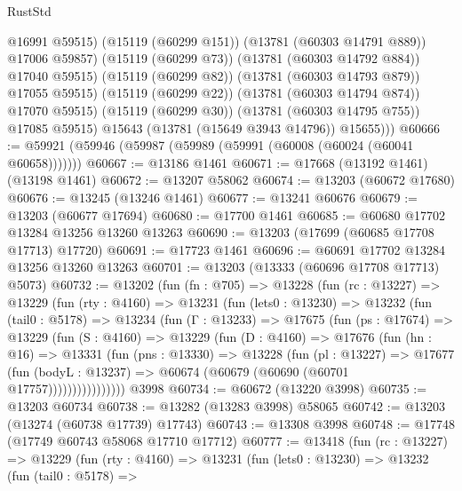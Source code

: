 \begin{lexlean}{RustStd}
\begin{coremodule}
                      @16991
                      @59515)
                    (@15119 (@60299 @151))
                    (@13781 (@60303 @14791 @889))
                    @17006
                    @59857)
                  (@15119 (@60299 @73))
                  (@13781 (@60303 @14792 @884))
                  @17040
                  @59515)
                (@15119 (@60299 @82))
                (@13781 (@60303 @14793 @879))
                @17055
                @59515)
              (@15119 (@60299 @22))
              (@13781 (@60303 @14794 @874))
              @17070
              @59515)
            (@15119 (@60299 @30))
            (@13781 (@60303 @14795 @755))
            @17085
            @59515)
          @15643
          (@13781 (@15649 @3943 @14796))
          @15655)))
@60666 := @59921 (@59946 (@59987 (@59989 (@59991 (@60008 (@60024 (@60041 @60658)))))))
@60667 := @13186 @1461
@60671 := @17668 (@13192 @1461) (@13198 @1461)
@60672 := @13207 @58062
@60674 := @13203 (@60672 @17680)
@60676 := @13245 (@13246 @1461)
@60677 := @13241 @60676
@60679 := @13203 (@60677 @17694)
@60680 := @17700 @1461
@60685 := @60680 @17702 @13284 @13256 @13260 @13263
@60690 := @13203 (@17699 (@60685 @17708 @17713) @17720)
@60691 := @17723 @1461
@60696 := @60691 @17702 @13284 @13256 @13260 @13263
@60701 := @13203 (@13333 (@60696 @17708 @17713) @5073)
@60732 := @13202
    (fun (fn : @705) =>
    @13228
      (fun (rc : @13227) =>
      @13229
        (fun (rty : @4160) =>
        @13231
          (fun (lets0 : @13230) =>
          @13232
            (fun (tail0 : @5178) =>
            @13234
              (fun (Γ : @13233) =>
              @17675
                (fun (ps : @17674) =>
                @13229
                  (fun (S : @4160) =>
                  @13229
                    (fun (D : @4160) =>
                    @17676
                      (fun (hn : @16) =>
                      @13331
                        (fun (pns : @13330) =>
                        @13228
                          (fun (pl : @13227) =>
                          @17677
                            (fun (bodyL : @13237) =>
                            @60674 (@60679 (@60690 (@60701 @17757))))))))))))))))
    @3998
@60734 := @60672 (@13220 @3998)
@60735 := @13203 @60734
@60738 := @13282 (@13283 @3998) @58065
@60742 := @13203 (@13274 (@60738 @17739) @17743)
@60743 := @13308 @3998
@60748 := @17748 (@17749 @60743 @58068 @17710 @17712)
@60777 := @13418
    (fun (rc : @13227) =>
    @13229
      (fun (rty : @4160) =>
      @13231
        (fun (lets0 : @13230) =>
        @13232
          (fun (tail0 : @5178) =>

\end{coremodule}
\end{lexlean}
